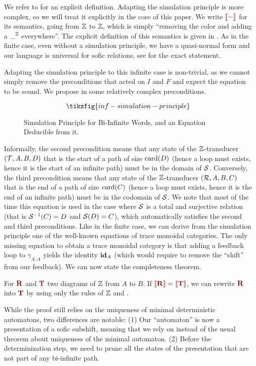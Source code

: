 We refer to  for an explicit definition. 
Adapting the simulation principle is more complex, so we will treat it explicitly in the core of this paper. 
We write $\rinterp{-}$ for its semantics, going from  $\ZZ$ to $\ZZ$, which is simply ``removing the color and adding a $\_^\ZZ$ everywhere''. The explicit definition of this semantics is given in . 
As in the finite case, even without a simulation principle, we have a quasi-normal form and our language is universal for sofic relations, see  for the exact statement.

Adapting the simulation principle to this infinite case is non-trivial, as we cannot simply remove the preconditions that acted on $I$ and $F$ and expect the equation to be sound. We propose in  some relatively complex preconditions. 
\begin{figure*}[!h]
	\[\tikzfig{inf-simulation-principle}\]
	\caption{Simulation Principle for Bi-Infinite Words, and an Equation Deducible from it.}
	\label{fig:inf-simulation-principle}
\end{figure*}

Informally, the second precondition means that any state of  the $\ZZ$-transducer $(\T,A,B,D)$ that is the start of a path of size $\textup{card}(D)$ (hence a loop must exists, hence it is the start of an infinite path) must be in the domain of $\S$. Conversely, the third precondition means that any state of the $\ZZ$-transducer $(\R,A,B,C)$ that is the end of a path of size $\textup{card}(C)$ (hence a loop must exists, hence it is the end of an infinite path) must be in the codomain of $\S$. We note that most of the time this equation is used in the case where $\S$ is a total and surjective relation (that is $\S^{-1}(C) = D$ and $\S(D) = C$), which automatically satisfies the second and third preconditions.
Like in the finite case, we can derive from the simulation principle one of the well-known equations of trace monoidal categories.
The only missing equation to obtain a trace monoidal category is that adding a feedback loop to $\gamma_{A,A}$ yields the identity $\id_A$ (which would require to remove the ``shift'' from our feedback).
We can now state the completeness theorem.

\begin{theorem}[Completeness]\label{thm:completeness-inf} For $\rR$ and $\rT$ two diagrams of $\ZZ$ from $A$ to $B$. If $\rinterp{\rR} = \rinterp{\rT}$, we can rewrite $\rR$ into $\rT$ by using only the rules of $\ZZ$ and .
\end{theorem}

While the proof still relies on the uniqueness of minimal deterministic automatons, two differences are notable: (1) Our ``automaton'' is now a presentation of a sofic subshift, meaning that we rely on  instead of the usual theorem about uniqueness of the minimal automaton. (2) Before the determinization step, we need to prune all the states of the presentation that are not part of any bi-infinite path.
